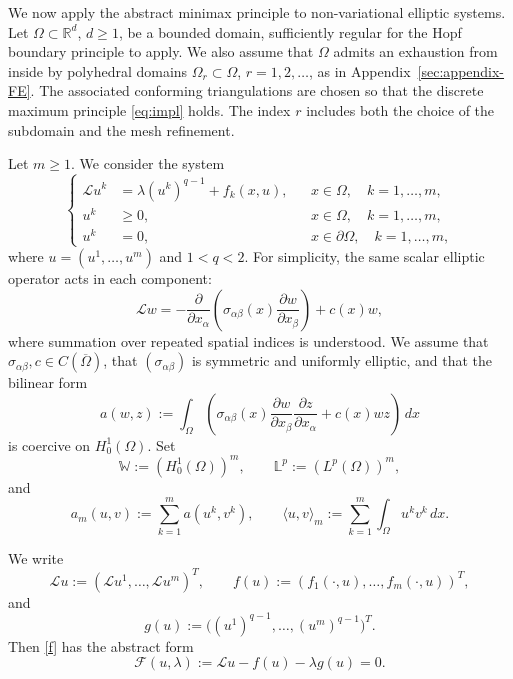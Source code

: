 \documentclass[preprint,10pt]{elsarticle}
\numberwithin{equation}{section}
\begin{document}
We now apply the abstract minimax principle to non-variational elliptic
systems. Let \(\Omega\subset\mathbb R^d\), \(d\ge1\), be a bounded domain,
sufficiently regular for the Hopf boundary principle to apply. We also assume
that \(\Omega\) admits an exhaustion from inside by polyhedral domains
\(\Omega_r\subset\Omega\), \(r=1,2,\ldots\), as in
Appendix~\ref{sec:appendix-FE}. The associated conforming triangulations are
chosen so that the discrete maximum principle \eqref{eq:impl} holds. The
index \(r\) includes both the choice of the subdomain and the mesh refinement.

Let \(m\ge1\). We consider the system
\begin{equation}
	\label{f}
	\left\{
	\begin{aligned}
		\mathcal L u^k
		&=\lambda (u^k)^{q-1}+f_k(x,u),
		&& x\in\Omega,\quad k=1,\ldots,m,\\
		u^k&\ge0,
		&& x\in\Omega,\quad k=1,\ldots,m,\\
		u^k&=0,
		&& x\in\partial\Omega,\quad k=1,\ldots,m,
	\end{aligned}
	\right.
\end{equation}
where \(u=(u^1,\ldots,u^m)\) and \(1<q<2\). For simplicity, the same scalar
elliptic operator acts in each component:
\begin{equation}\label{eq:mathL}
	\mathcal L w
	=
	-\frac{\partial}{\partial x_\alpha}
	\left(
	\sigma_{\alpha\beta}(x)
	\frac{\partial w}{\partial x_\beta}
	\right)
	+c(x)w ,
\end{equation}
where summation over repeated spatial indices is understood. We assume that
\(\sigma_{\alpha\beta},c\in C(\overline\Omega)\), that
\((\sigma_{\alpha\beta})\) is symmetric and uniformly elliptic, and that the
bilinear form
\begin{equation}\label{eq:awz}
	a(w,z):=
	\int_\Omega
	\left(
	\sigma_{\alpha\beta}(x)
	\frac{\partial w}{\partial x_\beta}
	\frac{\partial z}{\partial x_\alpha}
	+c(x)wz
	\right)\,dx
\end{equation}
is coercive on \(H_0^1(\Omega)\). Set
\[
\mathbb W:=(H_0^1(\Omega))^m,
\qquad
\mathbb L^p:=(L^p(\Omega))^m,
\]
and
\[
a_m(u,v):=\sum_{k=1}^m a(u^k,v^k),
\qquad
\langle u,v\rangle_m:=\sum_{k=1}^m\int_\Omega u^k v^k\,dx .
\]

We write
\[
\mathcal L u:=(\mathcal L u^1,\ldots,\mathcal L u^m)^T,
\qquad
f(u):=(f_1(\cdot,u),\ldots,f_m(\cdot,u))^T,
\]
and
\[
g(u):=\bigl((u^1)^{q-1},\ldots,(u^m)^{q-1}\bigr)^T .
\]
Then \eqref{f} has the abstract form
\[
\mathcal F(u,\lambda):=\mathcal L u-f(u)-\lambda g(u)=0.
\]
\end{document}
